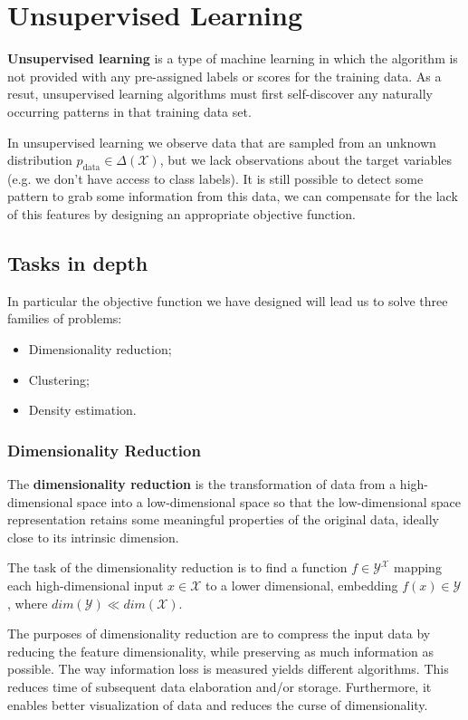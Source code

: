 \chapter{Unsupervised Learning}
\textbf{Unsupervised learning} is a type of machine learning in which the algorithm is not provided with any pre-assigned labels or scores for the training data. As a resut, unsupervised learning algorithms must first self-discover any naturally occurring patterns in that training data set.

In unsupervised learning we observe data that are sampled from an unknown distribution \(p_{\text{data}} \in \Delta(\mathcal{X})\), but we lack observations about the target variables (e.g. we don't have access to class labels). It is still possible to detect some pattern to grab some information from this data, we can compensate for the lack of this features by designing an appropriate objective function. 

\section{Tasks in depth}
In particular the objective function we have designed will lead us to solve three families of problems:
\begin{itemize}[topsep={0pt}, partopsep={0pt}]
    \itemsep0pt
    \item Dimensionality reduction;
    \item Clustering;
    \item Density estimation.
\end{itemize}
\subsection{Dimensionality Reduction}
The \textbf{dimensionality reduction} is the transformation of data from a high-dimensional space into a low-dimensional space so that the low-dimensional space representation retains some meaningful properties of the original data, ideally close to its intrinsic dimension.

The task of the dimensionality reduction is to find a function \(f \in \mathcal{Y}^{\mathcal{X}}\) mapping each high-dimensional input \(x \in \mathcal{X}\) to a lower dimensional, embedding \(f(x) \in \mathcal{Y}\), where \(dim(\mathcal{Y}) \ll dim(\mathcal{X})\).

The purposes of dimensionality reduction are to compress the input data by reducing the feature dimensionality, while preserving as much information as possible. The way information loss is measured yields different algorithms. This reduces time of subsequent data elaboration and/or storage. Furthermore, it enables better visualization of data and reduces the curse of dimensionality.

